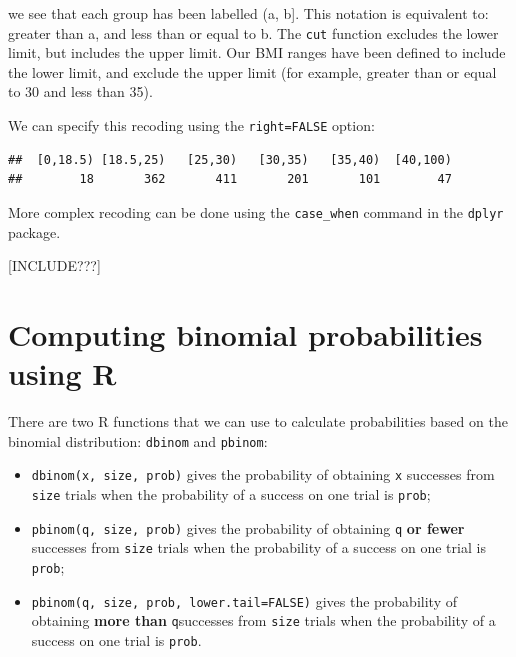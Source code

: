 \documentclass[
]{memoir}
\newenvironment{Shaded}{\begin{snugshade}}{\end{snugshade}}
\newcommand{\AttributeTok}[1]{\textcolor[rgb]{0.77,0.63,0.00}{#1}}
\newcommand{\ConstantTok}[1]{\textcolor[rgb]{0.00,0.00,0.00}{#1}}
\newcommand{\DecValTok}[1]{\textcolor[rgb]{0.00,0.00,0.81}{#1}}
\newcommand{\FloatTok}[1]{\textcolor[rgb]{0.00,0.00,0.81}{#1}}
\newcommand{\FunctionTok}[1]{\textcolor[rgb]{0.00,0.00,0.00}{#1}}
\newcommand{\NormalTok}[1]{#1}
\newcommand{\OtherTok}[1]{\textcolor[rgb]{0.56,0.35,0.01}{#1}}
\newcommand{\SpecialCharTok}[1]{\textcolor[rgb]{0.00,0.00,0.00}{#1}}
\providecommand{\tightlist}{%
  \setlength{\itemsep}{0pt}\setlength{\parskip}{0pt}}
\begin{document}
we see that each group has been labelled (a, b{]}. This notation is equivalent to: greater than a, and less than or equal to b. The \texttt{cut} function excludes the lower limit, but includes the upper limit. Our BMI ranges have been defined to include the lower limit, and exclude the upper limit (for example, greater than or equal to 30 and less than 35).

We can specify this recoding using the \texttt{right=FALSE} option:

\begin{Shaded}
\end{Shaded}

\begin{verbatim}
##  [0,18.5) [18.5,25)   [25,30)   [30,35)   [35,40)  [40,100) 
##        18       362       411       201       101        47
\end{verbatim}

More complex recoding can be done using the \texttt{case\_when} command in the \texttt{dplyr} package.

{[}INCLUDE???{]}

\hypertarget{computing-binomial-probabilities-using-r}{%
\section{Computing binomial probabilities using R}\label{computing-binomial-probabilities-using-r}}

There are two R functions that we can use to calculate probabilities based on the binomial distribution: \texttt{dbinom} and \texttt{pbinom}:

\begin{itemize}
\tightlist
\item
  \texttt{dbinom(x,\ size,\ prob)} gives the probability of obtaining \texttt{x} successes from \texttt{size} trials when the probability of a success on one trial is \texttt{prob};
\item
  \texttt{pbinom(q,\ size,\ prob)} gives the probability of obtaining \texttt{q} \textbf{or fewer} successes from \texttt{size} trials when the probability of a success on one trial is \texttt{prob};
\item
  \texttt{pbinom(q,\ size,\ prob,\ lower.tail=FALSE)} gives the probability of obtaining \textbf{more than} \texttt{q}successes from \texttt{size} trials when the probability of a success on one trial is \texttt{prob}.
\end{itemize}
\end{document}

